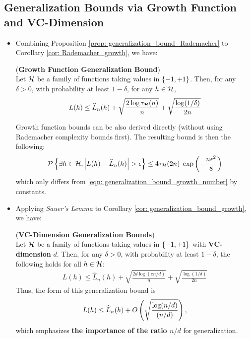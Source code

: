 \documentclass[11pt]{article}
\begin{document}
\subsection{Generalization Bounds via Growth Function and VC-Dimension}
\begin{itemize}
\item Combining Proposition \ref{prop: generalization_bound_Rademacher} to Corollary \ref{cor: Rademacher_growth}, we have:
\begin{corollary} \label{cor: generalization_bound_growth}   (\textbf{Growth Function Generalization Bound})  \citep{mohri2018foundations}\\
Let ${\mathcal H}$ be a family of functions taking values in $\left\{-1, +1\right\}$.  Then, for any $\delta > 0$, with probability at least $1 - \delta$, for any $h \in {\mathcal H}$,
\begin{align}
L(h) \le \widehat{L}_{n}(h) + \sqrt{\frac{2 \log \tau_{{\mathcal H}}(n)}{n}} +\sqrt{\frac{\log(1/\delta)}{2n}} \label{eqn: generalization_bound_growth_number}
\end{align}

Growth function bounds can be also derived directly (without using Rademacher complexity bounds first). The resulting bound is then the following:
\begin{align}
{\mathcal P}\left\{\exists h\in {\mathcal H}, \left\lvert L(h) - \widehat{L}_{n}(h) \right\rvert > \epsilon \right\}  \le 4\tau_{{\mathcal H}}(2n)\;\exp\left(-\frac{n\epsilon^2}{8}\right) \label{eqn: generalization_bound_growth_number_2}
\end{align}
which only differs from \eqref{eqn: generalization_bound_growth_number} by constants.
\end{corollary}

\item Applying \emph{Sauer's Lemma} to Corollary \ref{cor: generalization_bound_growth}, we have:
\begin{corollary} \label{cor: generalization_bound_vc} (\textbf{VC-Dimension Generalization Bounds}) \citep{mohri2018foundations}\\
Let ${\mathcal H}$ be a family of functions taking values in $\left\{-1, +1\right\}$ with \textbf{VC-dimension} $d$. Then, for any $\delta > 0$, with probability at least $1 - \delta$, the following holds for all $h \in {\mathcal H}$:
\begin{align}
L(h) \le \widehat{L}_{n}(h) + \sqrt{\frac{2d \log(en /d)}{n}} +\sqrt{\frac{\log(1/\delta)}{2n}} \label{eqn: generalization_bound_vc_dim}
\end{align}
Thus, the form of this generalization bound is
\begin{align}
L(h) \le \widehat{L}_{n}(h) + O\left(\sqrt{\frac{\log(n /d)}{(n/d)}}\right),  \label{eqn: generalization_bound_vc_dim2}
\end{align}
which emphasizes \textbf{the importance of the ratio $n/d$} for generalization. 
\end{corollary}


\end{itemize}
\end{document}
